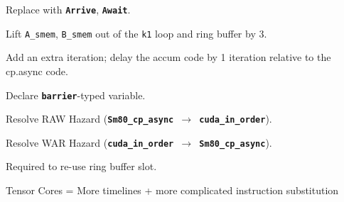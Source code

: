 {\large

}

{\LARGE
Replace with \textbf{\texttt{Arrive}}, \textbf{\texttt{Await}}.
}

\newpage
{}

{\large

}

{\LARGE

Lift \texttt{A\_smem}, \texttt{B\_smem} out of the \texttt{k1} loop and ring buffer by 3.

}

\newpage
{}

{\large

}

{\LARGE

Add an extra  iteration; delay the accum code by 1 iteration relative to the cp.async code.

}

\newpage
{}

{\large

}

{\LARGE
Declare \textbf{\texttt{barrier}}-typed variable.

}

\newpage
{}

{\large

}

{\LARGE
Resolve RAW Hazard (\textbf{\texttt{Sm80\_cp\_async $\to$ cuda\_in\_order}}).

}

\newpage
{}

{\large

}

{\LARGE
Resolve WAR Hazard (\textbf{\texttt{cuda\_in\_order $\to$ Sm80\_cp\_async}}).

Required to re-use ring buffer slot.

}

\newpage
{}

{\LARGE

Tensor Cores = More timelines + more complicated instruction substitution

}

\newpage
{}

